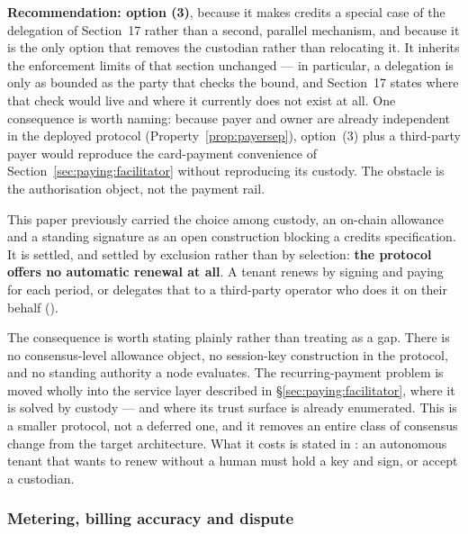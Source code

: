 \noindent\textbf{Recommendation: option (3)}, because it makes credits a special case of the
delegation of Section~17 rather than a second, parallel mechanism, and because it is the only option
that removes the custodian rather than relocating it. It inherits the enforcement limits of that
section unchanged --- in particular, a delegation is only as bounded as the party that checks the
bound, and Section~17 states where that check would live and where it currently does not exist at
all. One consequence is worth naming: because payer and owner are already independent in the
deployed protocol (Property~\ref{prop:payersep}), option~(3) plus a third-party payer would reproduce
the card-payment convenience of Section~\ref{sec:paying:facilitator} without reproducing its custody.
The obstacle is the authorisation object, not the payment rail.
\begin{remark}
\label{rem:no-protocol-renewal}
This paper previously carried the choice among custody, an on-chain allowance and a standing
signature as an open construction blocking a credits specification. It is settled, and settled by
exclusion rather than by selection: \textbf{the protocol offers no automatic renewal at all}. A
tenant renews by signing and paying for each period, or delegates that to a third-party operator who
does it on their behalf  (\planned).

The consequence is worth stating plainly rather than treating as a gap. There is no consensus-level
allowance object, no session-key construction in the protocol, and no standing authority a node
evaluates. The recurring-payment problem is moved wholly into the service layer described in
\S\ref{sec:paying:facilitator}, where it is solved by custody --- and where its trust surface is
already enumerated. This is a smaller protocol, not a deferred one, and it removes an entire class of
consensus change from the target architecture. What it costs is stated in
: an autonomous tenant that wants to renew without a human must hold
a key and sign, or accept a custodian.
\end{remark}

\subsubsection{Metering, billing accuracy and dispute}

